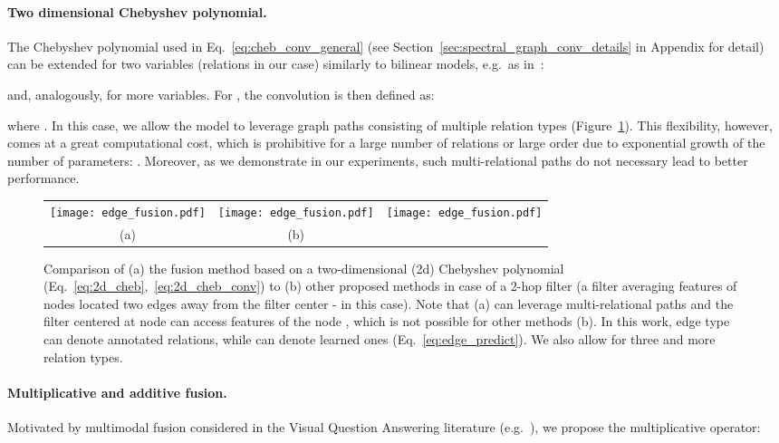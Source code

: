 \documentclass[final,nonatbib]{article} \usepackage{nips_2018}
\begin{document}
	\paragraph{Two dimensional Chebyshev polynomial.}
	The Chebyshev polynomial used in Eq.~\ref{eq:cheb_conv_general} (see Section~\ref{sec:spectral_graph_conv_details} in Appendix for detail) can be extended for two variables (relations in our case) similarly to bilinear models, e.g.~as in~\cite{omar2010two}:


	and, analogously, for more variables. For , the convolution is then defined as:


	where .
	In this case, we allow the model to leverage graph paths consisting of multiple relation types (Figure~\ref{fig:edge_fusion}).
	This flexibility, however, comes at a great computational cost, which is prohibitive for a large number of relations  or large order  due to exponential growth of the number of parameters: . Moreover, as we demonstrate in our experiments, such multi-relational paths do not necessary lead to better performance.

	\begin{figure}[]
		\begin{center}
			\begin{tabular}{ccc}
{\texttt{[image: edge\_fusion.pdf]}} &
				{\texttt{[image: edge\_fusion.pdf]}} &
				{\texttt{[image: edge\_fusion.pdf]}} \\
				(a) & (b) &
			\end{tabular}
		\end{center}
		\caption{Comparison of (a) the fusion method based on a two-dimensional (2d) Chebyshev polynomial (Eq.~\ref{eq:2d_cheb},~\ref{eq:2d_cheb_conv}) to (b) other proposed methods in case of a 2-hop filter (a filter averaging features of nodes located two edges away from the filter center -  in this case). Note that (a) can leverage multi-relational paths and the filter centered at node  can access features of the node , which is not possible for other methods (b). In this work, edge type  can denote annotated relations, while  can denote learned ones (Eq.~\ref{eq:edge_predict}). We also allow for three and more relation types.}
		\label{fig:edge_fusion}
	\end{figure}

	\paragraph{Multiplicative and additive fusion.}
	Motivated by multimodal fusion considered in the Visual Question Answering literature (e.g.~\cite{kim2016hadamard}), we propose the multiplicative operator:
	
\end{document}
